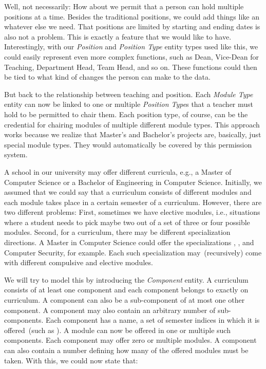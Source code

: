 Well, not necessarily:
How about we permit that a person can hold multiple positions at a time.
Besides the traditional positions, we could add things like   an whatever else we need.
That positions are limited by starting and ending dates is also not a problem.
This is exactly a feature that we would like to have.
Interestingly, with our \emph{Position} and \emph{Position Type} entity types used like this, we could easily represent even more complex functions, such as Dean, Vice-Dean for Teaching, Department Head, Team Head, and so on.
These functions could then be tied to what kind of changes the person can make to the data.

But back to the relationship between teaching and position.
Each \emph{Module Type} entity can now be linked to one or multiple \emph{Position Type}s that a teacher must hold to be permitted to chair them.
Each position type, of course, can be the credential for chairing modules of multiple different module types.
This approach works because we realize that Master's and Bachelor's projects are, basically, just special module types.
They would automatically be covered by this permission system.

A school in our university may offer different curricula, e.g., a Master of Computer Science or a Bachelor of Engineering in Computer Science.
Initially, we assumed that we could say that a curriculum consists of different modules and each module takes place in a certain semester of a curriculum.
However, there are two different problems:
First, sometimes we have elective modules, i.e., situations where a student needs to pick maybe two out of a set of three or four possible modules.
Second, for a curriculum, there may be different specialization directions.
A Master in Computer Science could offer the specializations , , and Computer Security, for example.
Each such specialization may~(recursively) come with different compulsive and elective modules.

We will try to model this by introducing the \emph{Component} entity.
A curriculum consists of at least one component and each component belongs to exactly on curriculum.
A component can also be a sub-component of at most one other component.
A component may also contain an arbitrary number of sub-components.
Each component has a name, a set of semester indices in which it is offered~(such as ).
A module can now be offered in one or multiple such components.
Each component may offer zero or multiple modules.
A component can also contain a number defining how many of the offered modules must be taken.
With this, we could now state that:

